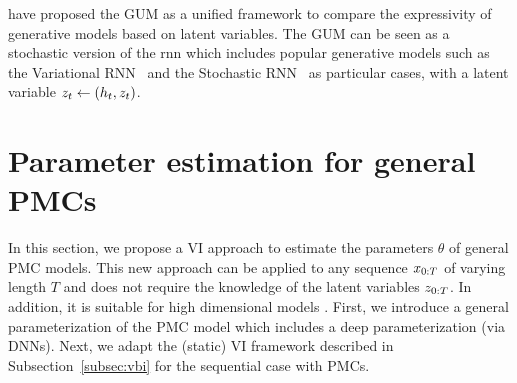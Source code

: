 \begin{remark}
    \cite{salaun2019comparing} have proposed the GUM as a unified framework
    to compare the expressivity of generative models based on latent variables.
    The GUM can be seen as a stochastic version of the \gls*{rnn} which 
    includes popular generative models such as
    the Variational RNN~\citep{chung2015recurrent} and 
    the Stochastic RNN~\citep{fraccaro2016sequential} as particular cases, 
    with a latent variable  
    $z_t \leftarrow (h_{t},z_{t})$. 
\end{remark}


\section{Parameter estimation for general PMCs}
\label{sub:pmc_parameter_estimation}
In this section, we propose a VI approach to  estimate the parameters $\theta$ 
of general PMC models.
This new approach can be applied to any sequence $x_{0:T}$ of varying length $T$
and  does not require the knowledge of the latent variables $z_{0:T}$.
In addition, it is suitable for high dimensional models \citep{Blei_2017}.
First, we introduce a general parameterization of the PMC model
which includes a deep parameterization (via DNNs).
Next, we adapt the  (static) VI framework described in 
Subsection~\ref{subsec:vbi}  
for the sequential case with  PMCs.





